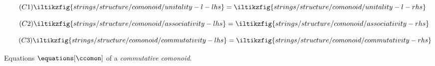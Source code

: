 \begin{figure}[p]
    \centering
    \begin{minipage}{0.21\textwidth}
        \begin{equation}
            \tag{\(\mathsf{C1}\)}
            \iltikzfig{strings/structure/comonoid/unitality-l-lhs}
            =
            \iltikzfig{strings/structure/comonoid/unitality-l-rhs}
            \label{eq:comonoid-unitality-l}
        \end{equation}
    \end{minipage}
    \begin{minipage}{0.26\textwidth}
        \begin{equation}
            \tag{\(\mathsf{C2}\)}
            \iltikzfig{strings/structure/comonoid/associativity-lhs}
            =
            \iltikzfig{strings/structure/comonoid/associativity-rhs}
            \label{eq:comonoid-associativity}
        \end{equation}
    \end{minipage}
    \begin{minipage}{0.26\textwidth}
        \begin{equation}
            \tag{\(\mathsf{C3}\)}
            \iltikzfig{strings/structure/comonoid/commutativity-lhs}
            =
            \iltikzfig{strings/structure/comonoid/commutativity-rhs}
            \label{eq:comonoid-commutativity}
        \end{equation}
    \end{minipage}
    \caption{Equations \(\equations[\ccomon]\) of a \emph{commutative comonoid}.}
    \label{fig:comonoid-equations}
\end{figure}
